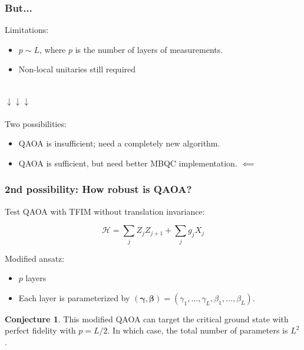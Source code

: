 \documentclass{beamer}
\theoremstyle{definition}
\newtheorem{conjecture}{Conjecture}[section]
\begin{document}


\begin{frame}
\frametitle{But...}
Limitations: 
\begin{itemize}
	\item $p \sim L$, where $p$ is the number of layers of measurements. 
	\item Non-local unitaries still required
\end{itemize}




$\,$\\

$\downarrow\downarrow\downarrow$\\

$\,$\\

Two possibilities:
\begin{itemize}
	\item QAOA is insufficient; need a completely new algorithm.
	\item QAOA is sufficient, but need better MBQC implementation. \pause $\impliedby$
\end{itemize} 



\end{frame}






\begin{frame}
\frametitle{2nd possibility: How robust is QAOA?}

Test QAOA with TFIM without translation invariance:

\begin{equation*}
\mathcal{H} = \sum_{j} Z_j Z_{j+1} + \sum_j g_j  X_j
\end{equation*}

Modified ansatz:
\begin{itemize}
	\item $p$ layers
	\item Each layer is parameterized by $(\bm\gamma,\bm\beta) = (\gamma_{1},\dots,\gamma_{L},\beta_{1},\dots,\beta_{L} )$.
\end{itemize}

\begin{conjecture}
	This modified QAOA can target the critical ground state with perfect fidelity with $p = L/2$. In which case, the total number of parameters is $L^2$.  
\end{conjecture}




\end{frame}
\end{document}
